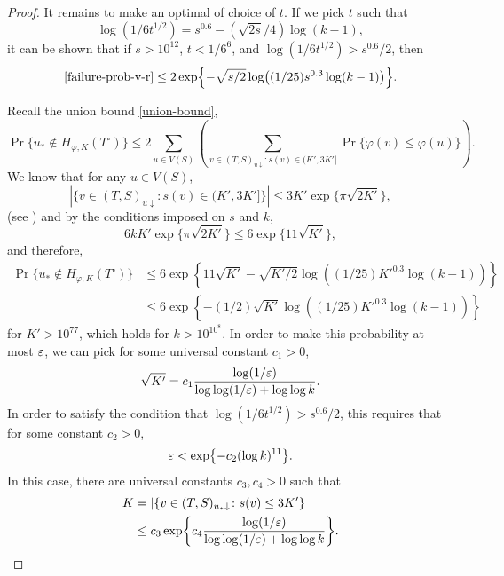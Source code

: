 \begin{proof}
  It remains to make an optimal of choice of $t$. If we pick $t$ such
  that
  \[
    \log (1/6t^{1/2}) = s^{0.6} - (\sqrt{2s}/4) \log (k - 1) ,
  \]
  it can be shown that if $s > 10^{12}$, $t < 1/6^6$, and
  $\log(1/6t^{1/2}) > s^{0.6}/2$, then
  \[
    \eqref{failure-prob-v-r} \le 2 \exp\left\{ - \sqrt{s/2} \log \left( (1/25) s^{0.3} \log (k - 1) \right) \right\} . %
  \]

  Recall the union bound \eqref{union-bound},
  \[
    \Pr\{u_* \not\in H_{\varphi; K}(T^\circ)\} \le 2 \sum_{u \in V(S)} \left( \sum_{v \in (T, S)_{u \downarrow} \colon s(v) \in (K', 3K']} \Pr\{\varphi(v) \le \varphi(u)\} \right) .
  \]
  We know that for any $u \in V(S)$,
  \[
    |\{v \in (T, S)_{u \downarrow} \colon s(v) \in (K', 3K']\}| \le 3K'
    \exp\{ \pi \sqrt{2 K'} \} ,
  \]
  (see \cite[Page 8, Equation (6)]{finding-adam}) and by the
  conditions imposed on $s$ and $k$,
  \[
    6 k K' \exp \{\pi \sqrt{2 K'} \} \le 6 \exp\{ 11 \sqrt{K'} \} ,
  \]
  and therefore,
  \begin{align*}
    \Pr\{u_* \not\in H_{\varphi; K}(T^\circ)\} &\le 6 \exp\left\{ 11 \sqrt{K'} - \sqrt{K'/2} \log \left((1/25) K'^{0.3} \log (k - 1)\right) \right\} \\
                                               &\le 6 \exp\left\{ - (1/2) \sqrt{K'} \log \left((1/25) K'^{0.3} \log (k - 1) \right) \right\}
  \end{align*}
  for $K' > 10^{77}$, which holds for $k > 10^{10^8}$. In order to
  make this probability at most $\varepsilon$, we can pick for some universal
  constant $c_1 > 0$,
  \[
    \sqrt{K'} = c_1  \frac{\log (1/\varepsilon)}{\log \log (1/\varepsilon) + \log \log k} .
  \]
  In order to satisfy the condition that
  $\log(1/6t^{1/2}) > s^{0.6}/2$, this requires that for some constant
  $c_2 > 0$,
  \[
    \eps < \exp \left\{ -c_2 (\log k)^{11} \right\} .
  \]
  In this case, there are universal constants $c_3, c_4 > 0$ such that
  \begin{align*}
    K &= |\{v \in (T, S)_{u_* \downarrow} \colon s(v) \le 3K'\} \\
      &\le c_3 \exp\left\{ c_4  \frac{\log (1/\eps)}{\log \log (1/\eps) + \log \log k} \right \} . \qedhere
  \end{align*}
\end{proof}
